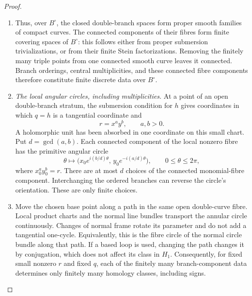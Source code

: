 \begin{proof}
\begin{enumerate}[label=\arabic*.,leftmargin=*]
\item Thus, over $B^\circ$, the closed double-branch spaces form
proper smooth families of compact curves. The connected
components of their fibres form finite covering spaces of
$B^\circ$: this follows either from proper submersion
trivializations, or from their finite Stein factorizations.
Removing the finitely many triple points from one connected
smooth curve leaves it connected. Branch orderings, central
multiplicities, and these connected fibre components therefore
constitute finite discrete data over $B^\circ$.

\item \emph{The local angular circles, including multiplicities.}
At a point of an open double-branch stratum, the submersion
condition for $h$ gives coordinates in which $q=h$ is a
tangential coordinate and
\begin{equation}
                 r=x^a y^b,\qquad a,b>0.
\label{pub:I:eq:B-4-31-2}
\end{equation}
A holomorphic unit has been absorbed in one coordinate on this
small chart. Put $d=\gcd(a,b)$. Each connected component of the
local nonzero fibre has the primitive angular circle
\begin{equation}
 \theta\longmapsto
 \bigl(x_0e^{i(b/d)\theta},\,
       y_0e^{-i(a/d)\theta}\bigr),
       \qquad 0\le\theta\le2\pi,
\label{pub:I:eq:B-4-31-3}
\end{equation}
where $x_0^a y_0^b=r$. There are at most $d$ choices of the
connected monomial-fibre component. Interchanging the ordered
branches can reverse the circle's orientation. These are only
finite choices.

\item Move the chosen base point along a path in the same open
double-curve fibre. Local product charts and the normal line
bundles transport the annular circle continuously. Changes of
normal frame rotate its parameter and do not add a tangential
one-cycle. Equivalently, this is the fibre circle of the normal
circle bundle along that path. If a based loop is used, changing
the path changes it by conjugation, which does not affect its
class in $H_1$. Consequently, for fixed small nonzero $r$ and
fixed $q$, each of the finitely many branch-component data
determines only finitely many homology classes, including signs.


\end{enumerate}
\end{proof}
